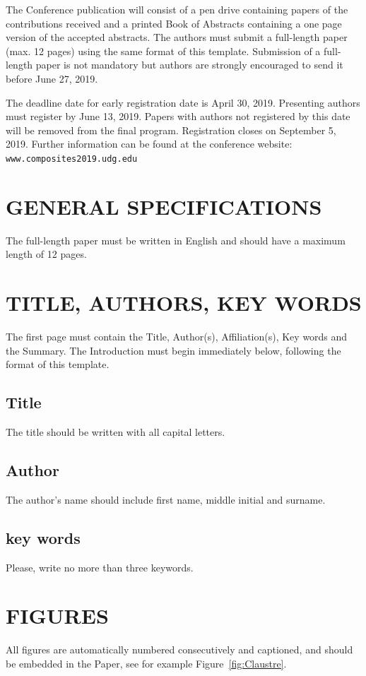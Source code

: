 \documentclass[12pt,a4paper]{article}
\begin{document}
The Conference publication will consist of a pen drive containing papers of the contributions received and a printed Book of Abstracts containing a one page version of the accepted abstracts. The authors must submit a full-length paper (max. 12 pages) using the same format of this template. Submission of a full-length paper is not mandatory but authors are strongly encouraged to send it before June 27, 2019.

The deadline date for early registration date is April 30, 2019. Presenting authors must register by June 13, 2019. Papers with authors not registered by this date will be removed from the final program.
Registration closes on September 5, 2019. Further information can be found at the conference website: \texttt{www.composites2019.udg.edu}

\section{GENERAL SPECIFICATIONS}
The full-length paper must be written in English and should have a maximum length of 12 pages.

\section{TITLE, AUTHORS, KEY WORDS}
The first page must contain the Title, Author(s), Affiliation(s), Key words and the Summary. The Introduction must begin immediately below, following the format of this template.

\subsection{Title}
The title should be written with all capital letters.
\subsection{Author}
The author's name should include first name, middle initial and surname.
\subsection{key words}
Please, write no more than three keywords.

\section{FIGURES}

All figures are automatically numbered consecutively and captioned, and should be embedded in the Paper, see for example Figure~\ref{fig:Claustre}.
\end{document}

